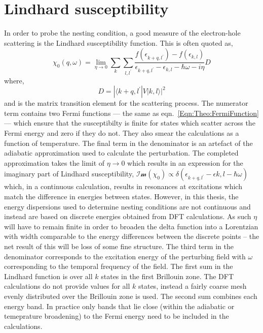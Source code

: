 
\section{Lindhard susceptibility}
\label{Sec:Theo:Susceptibility}

In order to probe the nesting condition, a good measure of the electron-hole scattering is the Lindhard susceptibility function. This is often quoted as,
\begin{equation}
    \chi_0(q, \omega) = \lim_{\eta \to 0} \sum_{k}\sum_{l,l^\prime}\frac{f(\epsilon_{k+q,l^\prime}) - f(\epsilon_{k,l})}{\epsilon_{k+q,l^\prime} - \epsilon_{k,l} - \hbar\omega - i\eta}D
    \label{Eqn:Intro:Lindhard}
\end{equation}
where,
\begin{equation}
    D = |\langle k+q,l^\prime|V|k,l \rangle|^2
\end{equation}
and is the matrix transition element for the scattering process. The numerator term contains two Fermi functions --- the same as eqn.~\ref{Eqn:Theo:FermiFunction} --- which ensure that the susceptibilty is finite for states which scatter across the Fermi energy and zero if they do not. They also smear the calculations as a function of temperature. The final term in the denominator is an artefact of the adiabatic approximation used to calculate the perturbation. The completed approximation takes the limit of $\eta \to 0$ which results in an expression for the imaginary part of Lindhard susceptibility, $\mathcal{Im}(\chi_0) \propto \delta(\epsilon_{k+q,l^\prime} - \epsilon{k,l} - \hbar\omega)$ which, in a continuous calculation, results in resonances at excitations which match the difference in energies between states. However, in this thesis, the energy dispersions used to determine nesting conditions are not continuous and instead are based on discrete energies obtained from DFT calculations. As such $\eta$ will have to remain finite in order to broaden the delta function into a Lorentzian with width comparable to the energy differences between the discrete points -- the net result of this will be loss of some fine structure. The third term in the denominator corresponds to the excitation energy of the perturbing field with $\omega$ corresponding to the temporal frequency of the field. The first sum in the Lindhard function is over all $k$ states in the first Brillouin zone. The DFT calculations do not provide values for all $k$ states, instead a fairly coarse mesh evenly distributed over the Brillouin zone is used. The second sum combines each energy band. In practice only bands that lie close (within the adiabatic or temeprature broadening) to the Fermi energy need to be included in the calculations.

